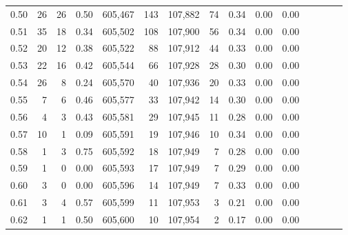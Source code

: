 \begin{tabular}{rrrcrrrrrrrrrrr}
0.50 &      26 &     26 &                                       0.50 &  605,467 &      143 &  107,882 &       74 &  0.34 &  0.00 &                         0.00 \\
0.51 &      35 &     18 &                                       0.34 &  605,502 &      108 &  107,900 &       56 &  0.34 &  0.00 &                         0.00 \\
0.52 &      20 &     12 &                                       0.38 &  605,522 &       88 &  107,912 &       44 &  0.33 &  0.00 &                         0.00 \\
0.53 &      22 &     16 &                                       0.42 &  605,544 &       66 &  107,928 &       28 &  0.30 &  0.00 &                         0.00 \\
0.54 &      26 &      8 &                                       0.24 &  605,570 &       40 &  107,936 &       20 &  0.33 &  0.00 &                         0.00 \\
0.55 &       7 &      6 &                                       0.46 &  605,577 &       33 &  107,942 &       14 &  0.30 &  0.00 &                         0.00 \\
0.56 &       4 &      3 &                                       0.43 &  605,581 &       29 &  107,945 &       11 &  0.28 &  0.00 &                         0.00 \\
0.57 &      10 &      1 &                                       0.09 &  605,591 &       19 &  107,946 &       10 &  0.34 &  0.00 &                         0.00 \\
0.58 &       1 &      3 &                                       0.75 &  605,592 &       18 &  107,949 &        7 &  0.28 &  0.00 &                         0.00 \\
0.59 &       1 &      0 &                                       0.00 &  605,593 &       17 &  107,949 &        7 &  0.29 &  0.00 &                         0.00 \\
0.60 &       3 &      0 &                                       0.00 &  605,596 &       14 &  107,949 &        7 &  0.33 &  0.00 &                         0.00 \\
0.61 &       3 &      4 &                                       0.57 &  605,599 &       11 &  107,953 &        3 &  0.21 &  0.00 &                         0.00 \\
0.62 &       1 &      1 &                                       0.50 &  605,600 &       10 &  107,954 &        2 &  0.17 &  0.00 &                         0.00 \\

\end{tabular}
